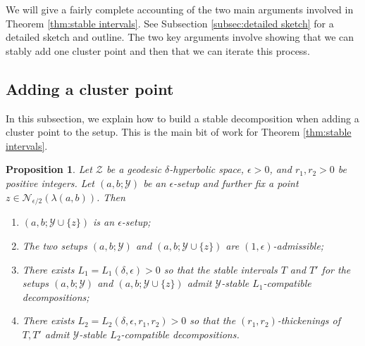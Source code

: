 \documentclass{amsart}
\newtheorem{proposition}[theorem]{Proposition}
\theoremstyle{definition}
\theoremstyle{remark}
\theoremstyle{definition}
\newcommand{\calN}{\mathcal{N}}
\newcommand{\calY}{\mathcal{Y}}
\newcommand{\calZ}{\mathcal{Z}}
\begin{document}
We will give a fairly complete accounting of the two main arguments involved in Theorem \ref{thm:stable intervals}.  See Subsection \ref{subsec:detailed sketch} for a detailed sketch and outline.  The two key arguments involve showing that we can stably add one cluster point and then that we can iterate this process.

\subsection{Adding a cluster point}

In this subsection, we explain how to build a stable decomposition when adding a cluster point to the setup.  This is the main bit of work for Theorem \ref{thm:stable intervals}.

\begin{proposition} \label{prop:add cluster}
Let $\calZ$ be a geodesic $\delta$-hyperbolic space, $\epsilon>0$, and $r_1,r_2>0$ be positive integers.  Let $(a,b;\calY)$ be an $\epsilon$-setup and further fix a point $z \in \calN_{\epsilon/2}(\lambda(a,b))$.  Then
\begin{enumerate}
\item $(a,b;\calY \cup \{z\})$ is an $\epsilon$-setup;
\item The two setups $(a,b;\calY)$ and $(a,b;\calY \cup \{z\})$ are $(1,\epsilon)$-admissible;
\item There exists $L_1=L_1(\delta, \epsilon)>0$ so that the stable intervals $T$ and $T'$ for the setups $(a,b;\calY)$ and $(a,b;\calY \cup \{z\})$ admit $\calY$-stable $L_1$-compatible decompositions;
\item There exists $L_2 = L_2(\delta, \epsilon, r_1,r_2)>0$ so that the $(r_1,r_2)$-thickenings of $T,T'$ admit $\calY$-stable $L_2$-compatible decompositions.
\end{enumerate}
\end{proposition}
\end{document}
